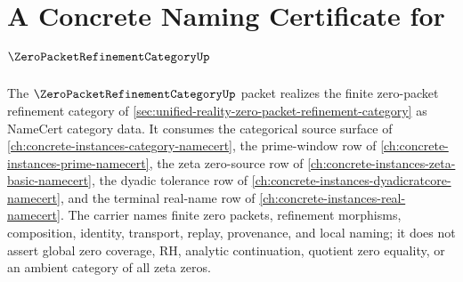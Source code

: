 \chapter{A Concrete Naming Certificate for $\ZeroPacketRefinementCategoryUp$}
\label{ch:concrete-instances-zero-packet-refinement-category-namecert}

The $\ZeroPacketRefinementCategoryUp$ packet realizes the finite zero-packet refinement category of \autoref{sec:unified-reality-zero-packet-refinement-category} as NameCert category data. It consumes the categorical source surface of \autoref{ch:concrete-instances-category-namecert}, the prime-window row of \autoref{ch:concrete-instances-prime-namecert}, the zeta zero-source row of \autoref{ch:concrete-instances-zeta-basic-namecert}, the dyadic tolerance row of \autoref{ch:concrete-instances-dyadicratcore-namecert}, and the terminal real-name row of \autoref{ch:concrete-instances-real-namecert}. The carrier names finite zero packets, refinement morphisms, composition, identity, transport, replay, provenance, and local naming; it does not assert global zero coverage, RH, analytic continuation, quotient zero equality, or an ambient category of all zeta zeros.



